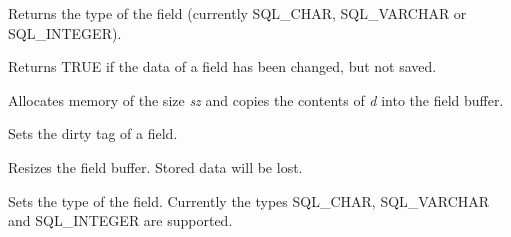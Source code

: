 
Returns the type of the field (currently SQL\_CHAR, SQL\_VARCHAR or SQL\_INTEGER).
 


Returns TRUE if the data of a field has been changed, but not saved.



Allocates memory of the size {\it sz} and copies the contents of {\it d} into the
field buffer.
  


Sets the dirty tag of a field.



Resizes the field buffer. Stored data will be lost.
  


Sets the type of the field. Currently the types SQL\_CHAR, SQL\_VARCHAR and
SQL\_INTEGER are supported.

